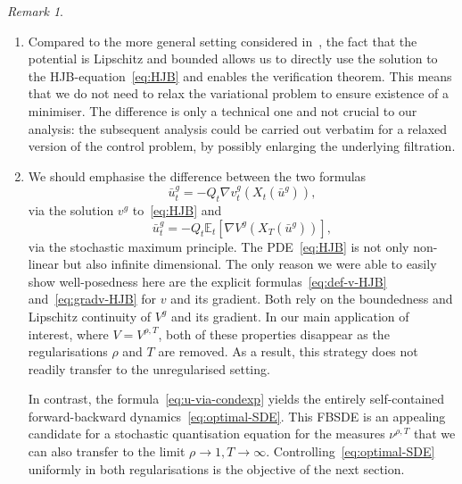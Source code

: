 \documentclass[11pt, a4paper]{scrartcl}
\numberwithin{equation}{section}
\theoremstyle{plain}
\theoremstyle{remark}
\newtheorem{remark}[foo]{Remark}
\newcommand{\tmdummy}{$\mbox{}$}
\newenvironment{enumeratealpha}{\begin{enumerate}[a{\textup{)}}] }{\end{enumerate}}
\begin{document}
\begin{remark}
	\label{rem:ctrl-prob}{\tmdummy}
	\begin{enumeratealpha}
		\item Compared to the more general setting considered
		in~{\cite{barashkovVariationalMethodEuclidean2023}}, the fact that the
		potential is Lipschitz and bounded allows us to directly use the solution
		to the HJB-equation~\eqref{eq:HJB} and enables the verification theorem.
		This means that we do not need to relax the variational problem to ensure
		existence of a minimiser. The difference is only a technical one and not
		crucial to our analysis: the subsequent analysis could be carried out
		verbatim for a relaxed version of the control problem, by possibly
		enlarging the underlying filtration.

		\item \label{rem:HJB-vs-condexp}We should emphasise the difference between
		the two formulas
		\begin{equation}
			\bar{u}^g_t = - Q_t \nabla v^g_t (X_t (\bar{u}^g)),
			\label{eq:u-via-HJB-2}
		\end{equation}
		via the solution $v^g$ to~\eqref{eq:HJB} and
		\begin{equation}
			\bar{u}^g_t = - Q_t \mathbb{E}_t [\nabla V^g (X_T (\bar{u}^g))],
			\label{eq:u-via-condexp}
		\end{equation}
		via the stochastic maximum principle. The PDE~\eqref{eq:HJB} is not only
		non-linear but also infinite dimensional. The only reason we were able to
		easily show well-posedness here are the explicit
		formulas~\eqref{eq:def-v-HJB} and~\eqref{eq:gradv-HJB} for $v$ and its
		gradient. Both rely on the boundedness and Lipschitz continuity of $V^g$
		and its gradient. In our main application of interest, where $V = V^{\rho,
					T}$, both of these properties disappear as the regularisations $\rho$ and
		$T$ are removed. As a result, this strategy does not readily transfer to
		the unregularised setting.

		In contrast, the formula~\eqref{eq:u-via-condexp} yields the entirely
		self-contained forward-backward dynamics~\eqref{eq:optimal-SDE}. This
		FBSDE is an appealing candidate for a stochastic quantisation equation for
		the measures $\nu^{\rho, T}$ that we can also transfer to the limit $\rho
			\rightarrow 1, T \rightarrow \infty$. Controlling~\eqref{eq:optimal-SDE}
		uniformly in both regularisations is the objective of the next section.
	\end{enumeratealpha}
\end{remark}
\end{document}
